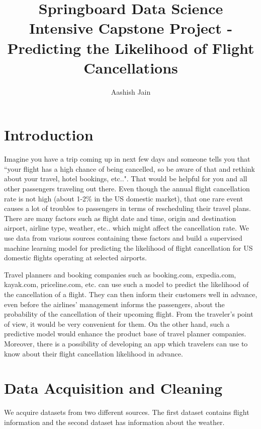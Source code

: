 \documentclass[12pt]{article}
\author{Aashish Jain}
\title{Springboard Data Science Intensive Capstone Project - Predicting the Likelihood of Flight Cancellations}
\begin{document}
\setcounter{page}{-2}
\maketitle
\thispagestyle{empty}
\thispagestyle{empty}
\newpage
\begingroup
\def\addvspace#1{}
\tableofcontents
\endgroup
\thispagestyle{empty}
\newpage
\large
{}
\section{Introduction}
\label{Sec:intro}
Imagine you have a trip coming up in next few days and someone tells you that ``your flight has a high chance of being cancelled, so be aware of that and rethink about your travel, hotel bookings, etc..". That would be helpful for you and all other passengers traveling out there. Even though the annual flight cancellation rate is not high (about 1-2$\%$ in the US domestic market), that one rare event causes a lot of troubles to passengers in terms of rescheduling their travel plans. There are many factors such as flight date and time, origin and destination airport, airline type, weather, etc.. which might affect the cancellation rate. We use data from various sources containing these factors and build a supervised machine learning model for predicting the likelihood of flight cancellation for US domestic flights operating at selected airports.


Travel planners and booking companies such as booking.com, expedia.com, kayak.com, priceline.com, etc. can use such a model to predict the likelihood of the cancellation of a flight. They can then inform their customers well in advance, even before the airlines' management informs the passengers, about the probability of the cancellation of their upcoming flight. From the traveler's point of view, it would be very convenient for them. On the other hand, such a predictive model would enhance the product base of travel planner companies. Moreover, there is a possibility of developing an app which travelers can use to know about their flight cancellation likelihood in advance.
\section{Data Acquisition and Cleaning}
\label{sec:dataclean}
We acquire datasets from two different sources. The first dataset contains flight information and the second dataset has information about the weather. 
\end{document}
